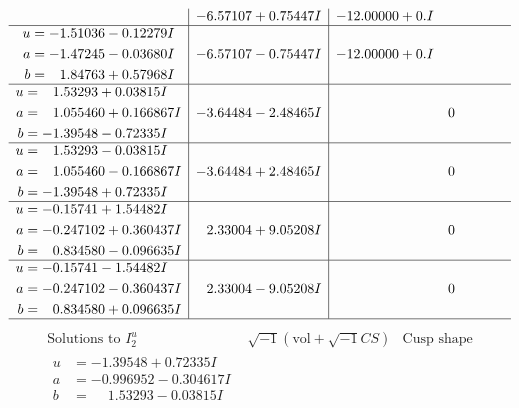 \documentclass[1p]{elsarticle_modified}
\theoremstyle{definition}
\newcommand{\I}{\sqrt{-1}}
\begin{document}
$$\begin{array}{c|c|c}
 & -6.57107 + 0.75447 I & -12.00000 + 0. I\phantom{ +0.000000I} \\ \hline\begin{aligned}
u &= -1.51036 - 0.12279 I \\
a &= -1.47245 - 0.03680 I \\
b &= \phantom{-}1.84763 + 0.57968 I\end{aligned}
 & -6.57107 - 0.75447 I & -12.00000 + 0. I\phantom{ +0.000000I} \\ \hline\begin{aligned}
u &= \phantom{-}1.53293 + 0.03815 I \\
a &= \phantom{-}1.055460 + 0.166867 I \\
b &= -1.39548 - 0.72335 I\end{aligned}
 & -3.64484 - 2.48465 I & \phantom{-0.000000 } 0 \\ \hline\begin{aligned}
u &= \phantom{-}1.53293 - 0.03815 I \\
a &= \phantom{-}1.055460 - 0.166867 I \\
b &= -1.39548 + 0.72335 I\end{aligned}
 & -3.64484 + 2.48465 I & \phantom{-0.000000 } 0 \\ \hline\begin{aligned}
u &= -0.15741 + 1.54482 I \\
a &= -0.247102 + 0.360437 I \\
b &= \phantom{-}0.834580 - 0.096635 I\end{aligned}
 & \phantom{-}2.33004 + 9.05208 I & \phantom{-0.000000 } 0 \\ \hline\begin{aligned}
u &= -0.15741 - 1.54482 I \\
a &= -0.247102 - 0.360437 I \\
b &= \phantom{-}0.834580 + 0.096635 I\end{aligned}
 & \phantom{-}2.33004 - 9.05208 I & \phantom{-0.000000 } 0\\
 \hline 
 \end{array}$$\newpage$$\begin{array}{c|c|c}  
\text{Solutions to }I^u_{2}& \I (\text{vol} + \sqrt{-1}CS) & \text{Cusp shape}\\
 \hline 
\begin{aligned}
u &= -1.39548 + 0.72335 I \\
a &= -0.996952 - 0.304617 I \\
b &= \phantom{-}1.53293 - 0.03815 I\end{aligned}

\end{array}$$
\end{document}
